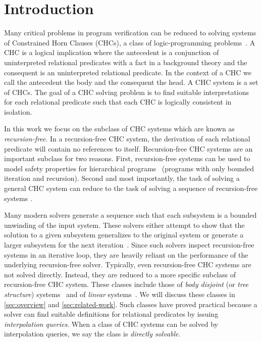 \section{Introduction}
\label{sec:intro}
Many critical problems in program verification can be reduced to
solving systems of Constrained Horn Clauses (CHCs), a class of
logic-programming
problems~\cite{bjorner13,flanagan03,rummer13a,rummer13b}.
%
A CHC is a logical implication where the antecedent is a conjunction
of uninterpreted relational predicates with a fact in a background
theory and the consequent is an uninterpreted relational predicate. In
the context of a CHC we call the antecedent the body and the
consequent the head.  A CHC system is a set of CHCs.
%
The goal of a CHC solving problem is to find suitable interpretations
for each relational predicate such that each CHC is logically
consistent in isolation.

In this work we focus on the subclass of CHC systems which are known
as \emph{recursion-free}. In a recursion-free CHC system, the
derivation of each relational predicate will contain no references to
itself. 
%
Recursion-free CHC systems are an important subclass for two reasons.
%
First, recursion-free systems can be used to model safety properties
for hierarchical programs~\cite{lal-qadeer15,lal-qadeer-lahiri12}
(programs with only bounded iteration and recursion).
%
Second and most importantly, the task of solving a general CHC
system can reduce to the task of solving a sequence of recursion-free
systems .

Many  modern solvers generate
a sequence such that each subsystem is a bounded unwinding of the
input system. These solvers either attempt to show that the solution to a
given subsystem generalizes to the original system or generate a
larger subsystem for the next iteration~\cite{bjorner13}.
%
Since such solvers inspect recursion-free systems in an iterative
loop, they are heavily reliant on the performance of the underlying
recursion-free solver.
%
Typically, even recursion-free CHC systems are not solved directly.
Instead, they are reduced to a more specific subclass of
recursion-free CHC system.
%
These classes include those of
\emph{body disjoint} (or \emph{tree structure})
systems~\cite{heizmann10,bjorner13,mcmillan14,rummer13a,rummer13b} and
of \emph{linear} systems~\cite{albarghouthi12a}.
%
We will discuss these classes in \autoref{sec:overview} and
\autoref{sec:related-work}.
%
Such classes have proved practical because a solver can find
suitable definitions for relational predicates by issuing
\emph{interpolation queries}.
%
When a class of CHC systems can be solved by interpolation queries, we
say the class is \emph{directly solvable}.


